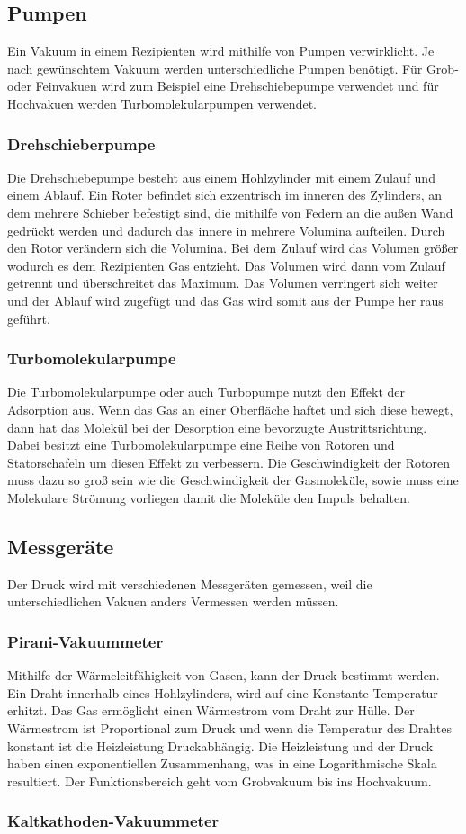\subsection{Pumpen}
Ein Vakuum in einem Rezipienten wird mithilfe von Pumpen verwirklicht. Je nach gewünschtem Vakuum werden unterschiedliche Pumpen benötigt. Für Grob- oder Feinvakuen wird zum Beispiel eine Drehschiebepumpe verwendet und für Hochvakuen werden Turbomolekularpumpen verwendet.
\subsubsection{Drehschieberpumpe}
Die Drehschiebepumpe besteht aus einem Hohlzylinder mit einem Zulauf und einem Ablauf. Ein Roter befindet sich exzentrisch im inneren des Zylinders, an dem mehrere Schieber befestigt sind, die mithilfe von Federn an die außen Wand gedrückt werden und dadurch das innere in mehrere Volumina aufteilen. Durch den Rotor verändern sich die Volumina. Bei dem Zulauf wird das Volumen größer wodurch es dem Rezipienten Gas entzieht. Das Volumen wird dann vom Zulauf getrennt und überschreitet das Maximum. Das Volumen verringert sich weiter und der Ablauf wird zugefügt und das Gas wird somit aus der Pumpe her raus geführt.

\subsubsection{Turbomolekularpumpe}
Die Turbomolekularpumpe oder auch Turbopumpe nutzt den Effekt der Adsorption aus. Wenn das Gas an einer Oberfläche haftet und sich diese bewegt, dann hat das Molekül bei der Desorption eine bevorzugte Austrittsrichtung. Dabei besitzt eine Turbomolekularpumpe eine Reihe von Rotoren und Statorschafeln um diesen Effekt zu verbessern. Die Geschwindigkeit der Rotoren muss dazu so groß sein wie die Geschwindigkeit der Gasmoleküle, sowie muss eine Molekulare Strömung vorliegen damit die Moleküle den Impuls behalten.
\subsection{Messgeräte}
Der Druck wird mit verschiedenen Messgeräten gemessen, weil die unterschiedlichen Vakuen anders Vermessen werden müssen.
\subsubsection{Pirani-Vakuummeter}
Mithilfe der Wärmeleitfähigkeit von Gasen, kann der Druck bestimmt werden. Ein Draht innerhalb eines Hohlzylinders, wird auf eine Konstante Temperatur erhitzt. Das Gas ermöglicht einen Wärmestrom vom Draht zur Hülle. Der Wärmestrom ist Proportional zum Druck und wenn die Temperatur des Drahtes konstant ist die Heizleistung Druckabhängig. Die Heizleistung und der Druck haben einen exponentiellen Zusammenhang, was in eine Logarithmische Skala resultiert. Der Funktionsbereich geht vom Grobvakuum bis ins Hochvakuum.
\subsubsection{Kaltkathoden-Vakuummeter}



